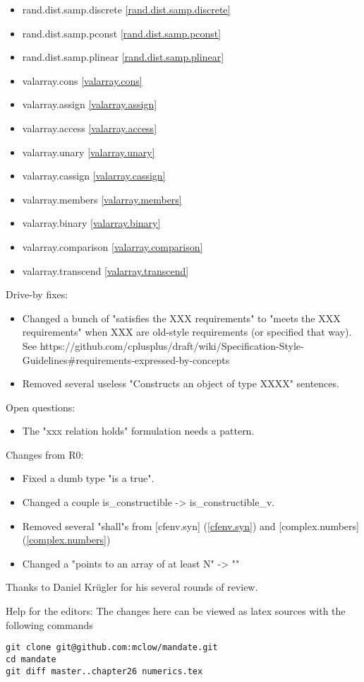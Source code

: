 \begin{multicols}{3}
\begin{itemize}
\item{rand.dist.samp.discrete}	\ref{rand.dist.samp.discrete}
\item{rand.dist.samp.pconst}	\ref{rand.dist.samp.pconst}
\item{rand.dist.samp.plinear}	\ref{rand.dist.samp.plinear}
\item{valarray.cons}			\ref{valarray.cons}
\item{valarray.assign}			\ref{valarray.assign}
\item{valarray.access}			\ref{valarray.access}
\item{valarray.unary}			\ref{valarray.unary}
\item{valarray.cassign}			\ref{valarray.cassign}
\item{valarray.members}			\ref{valarray.members}
\item{valarray.binary}			\ref{valarray.binary}
\item{valarray.comparison}		\ref{valarray.comparison}
\item{valarray.transcend}		\ref{valarray.transcend}
\end{itemize}
\end{multicols}

Drive-by fixes:
\begin{itemize}
\item{Changed a bunch of "satisfies the XXX requirements" to "meets the XXX requirements" when XXX are old-style requirements (or specified that way). See https://github.com/cplusplus/draft/wiki/Specification-Style-Guidelines\#requirements-expressed-by-concepts}
\item{Removed several useless "Constructs an object of type XXXX" sentences.}
\end{itemize}

Open questions:
\begin{itemize}
\item{The "xxx relation holds" formulation needs a pattern.}
\end{itemize}


Changes from R0:
\begin{itemize}
\item{Fixed a dumb type "is a true".}
\item{Changed a couple is_constructible -> is_constructible_v.}
\item{Removed several "shall"s from [cfenv.syn] (\ref{cfenv.syn}) and [complex.numbers] (\ref{complex.numbers})}
\item{Changed a "points to an array of at least N" -> "\tcode{[p, p+n) is a valid range}"}\end{itemize}

Thanks to Daniel Krügler for his several rounds of review.

\vfill
Help for the editors: The changes here can be viewed as latex sources with the following commands
\begin{verbatim}
git clone git@github.com:mclow/mandate.git
cd mandate
git diff master..chapter26 numerics.tex
\end{verbatim}
